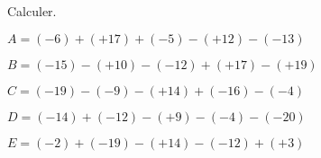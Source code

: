 \begin{exercice*}
    Calculer.
        \begin{list}{}
            \item $ A =  (-6)+(+17)+(-5)-(+12)-(-13) $
            \item $ B =  (-15)-(+10)-(-12)+(+17)-(+19) $
            \item $ C =  (-19)-(-9)-(+14)+(-16)-(-4) $
            \item $ D =  (-14)+(-12)-(+9)-(-4)-(-20) $
            \item $ E =  (-2)+(-19)-(+14)-(-12)+(+3) $
        \end{list}
\end{exercice*}
